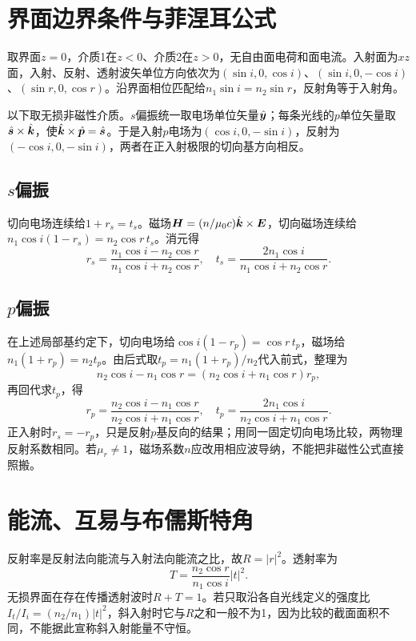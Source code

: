 \section{界面边界条件与菲涅耳公式}\label{th:o4fresnel}
取界面$z=0$，介质1在$z<0$、介质2在$z>0$，无自由面电荷和面电流。入射面为$xz$面，入射、反射、透射波矢单位方向依次为$(\sin i,0,\cos i)$、$(\sin i,0,-\cos i)$、$(\sin r,0,\cos r)$。沿界面相位匹配给$n_1\sin i=n_2\sin r$，反射角等于入射角。

以下取无损非磁性介质。$s$偏振统一取电场单位矢量$\hat{\bm{y}}$；每条光线的$p$单位矢量取$\hat{\bm{s}}\times\hat{\bm{k}}$，使$\hat{\bm{k}}\times\hat{\bm{p}}=\hat{\bm{s}}$。于是入射$p$电场为$(\cos i,0,-\sin i)$，反射为$(-\cos i,0,-\sin i)$，两者在正入射极限的切向基方向相反。

\subsection{$s$偏振}
切向电场连续给$1+r_s=t_s$。磁场$\bm{H}=(n/\mu_0c)\hat{\bm{k}}\times\bm{E}$，切向磁场连续给$n_1\cos i(1-r_s)=n_2\cos r\,t_s$。消元得
\[
 r_s=\frac{n_1\cos i-n_2\cos r}{n_1\cos i+n_2\cos r},\quad
 t_s=\frac{2n_1\cos i}{n_1\cos i+n_2\cos r}.
\]
\subsection{$p$偏振}
在上述局部基约定下，切向电场给$\cos i(1-r_p)=\cos r\,t_p$，磁场给$n_1(1+r_p)=n_2t_p$。由后式取$t_p=n_1(1+r_p)/n_2$代入前式，整理为
\[
 n_2\cos i-n_1\cos r=(n_2\cos i+n_1\cos r)r_p,
\]
再回代求$t_p$，得
\[
 r_p=\frac{n_2\cos i-n_1\cos r}{n_2\cos i+n_1\cos r},\quad
 t_p=\frac{2n_1\cos i}{n_2\cos i+n_1\cos r}.
\]
正入射时$r_s=-r_p$，只是反射$p$基反向的结果；用同一固定切向电场比较，两物理反射系数相同。若$\mu_r\ne1$，磁场系数$n$应改用相应波导纳，不能把非磁性公式直接照搬。

\section{能流、互易与布儒斯特角}\label{th:o4energy}
反射率是反射法向能流与入射法向能流之比，故$R=|r|^2$。透射率为
\[
 T=\frac{n_2\cos r}{n_1\cos i}|t|^2.
\]
无损界面在存在传播透射波时$R+T=1$。若只取沿各自光线定义的强度比$I_t/I_i=(n_2/n_1)|t|^2$，斜入射时它与$R$之和一般不为1，因为比较的截面面积不同，不能据此宣称斜入射能量不守恒。

